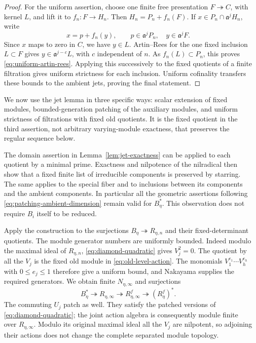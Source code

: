\begin{proof}
For the uniform assertion, choose one finite free presentation
$F\twoheadrightarrow C$, with kernel $L$, and lift it to
$f_n:F\to H_n$.  Then $H_n=P_n+f_n(F)$.  If
$x\in P_n\cap\mathfrak a^jH_n$, write
\[
 x=p+f_n(y),\qquad p\in\mathfrak a^jP_n,
 \quad y\in\mathfrak a^jF.
\]
Since $x$ maps to zero in $C$, we have $y\in L$.
Artin--Rees for the one fixed inclusion $L\subset F$ gives
$y\in\mathfrak a^{j-c}L$, with $c$ independent of $n$.
As $f_n(L)\subset P_n$, this proves
\eqref{eq:uniform-artin-rees}.  Applying this successively to
the fixed quotients of a finite filtration gives uniform
strictness for each inclusion.  Uniform cofinality transfers
these bounds to the ambient jets, proving the final statement.
\end{proof}

We now use the jet lemma in three specific ways: scalar extension
of fixed modules, bounded-generation patching of the auxiliary
modules, and uniform strictness of filtrations with fixed old
quotients. It is the fixed quotient in the third assertion, not
arbitrary varying-module exactness, that preserves the regular
sequence below.

The domain assertion in Lemma~\ref{lem:jet-exactness} can be applied
to each quotient by a minimal prime.  Exactness and nilpotence of
the nilradical then show that a fixed finite list of irreducible
components is preserved by starring.  The same applies to the
special fiber and to inclusions between its components and the
ambient components.  In particular all the geometric assertions
following \eqref{eq:patching-ambient-dimension} remain valid for
$B_\eta^*$.  This observation does not require $B_i$ itself to be
reduced.

Apply the construction to the surjections
$B_\eta\twoheadrightarrow R_{\eta,n}$ and their fixed-determinant
quotients.  The module generator numbers are uniformly bounded.
Indeed modulo the maximal ideal of $R_{\eta,n}$,
\eqref{eq:diamond-quadratic} gives $V_j^2=0$.
The quotient by all the $V_j$ is the fixed old module in
\eqref{eq:old-level-action}.  The monomials
$V_1^{e_1}\cdots V_h^{e_h}$ with $0\leq e_j\leq1$ therefore
give a uniform bound, and Nakayama supplies the required generators.
We obtain finite $N_{\eta,\infty}$ and surjections
\[
 B_\eta^*\twoheadrightarrow R_{\eta,\infty}
 \twoheadrightarrow R_{\eta,\infty}^f
 \twoheadrightarrow(R_\eta^f)^*.
\]
The commuting $U_j$ patch as well.  They satisfy the patched
versions of \eqref{eq:diamond-quadratic}; the joint action algebra
is consequently module finite over $R_{\eta,\infty}$.
Modulo its original maximal ideal all the $V_j$ are nilpotent,
so adjoining their actions does not change the complete separated
module topology.

